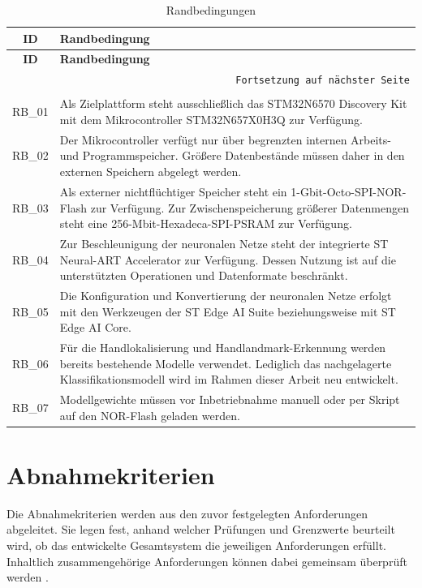 \begin{longtable}{|c|p{}|}
    \hline
    \textbf{ID} & \textbf{Randbedingung} \\
    \hline
    \endfirsthead
    \hline
    \textbf{ID} & \textbf{Randbedingung} \\
    \hline
    \endhead
    \hline
    \multicolumn{2}{r}{\texttt{Fortsetzung auf nächster Seite}} \\
    \endfoot
    \caption{Randbedingungen}
    \label{tab:randbedingungen} \\
    \endlastfoot
    RB\_01 & Als Zielplattform steht ausschließlich das STM32N6570 Discovery Kit mit dem Mikrocontroller STM32N657X0H3Q zur Verfügung. \\
    \hline
    RB\_02 & Der Mikrocontroller verfügt nur über begrenzten internen Arbeits- und Programmspeicher. Größere Datenbestände müssen daher in den externen Speichern abgelegt werden. \\
    \hline
    RB\_03 & Als externer nichtflüchtiger Speicher steht ein 1-Gbit-Octo-SPI-NOR-Flash zur Verfügung. Zur Zwischenspeicherung größerer Datenmengen steht eine 256-Mbit-Hexadeca-SPI-PSRAM zur Verfügung. \\
    \hline
    RB\_04 & Zur Beschleunigung der neuronalen Netze steht der integrierte ST Neural-ART Accelerator zur Verfügung. Dessen Nutzung ist auf die unterstützten Operationen und Datenformate beschränkt. \\
    \hline
    RB\_05 & Die Konfiguration und Konvertierung der neuronalen Netze erfolgt mit den Werkzeugen der ST Edge AI Suite beziehungsweise mit ST Edge AI Core. \\
    \hline
    RB\_06 & Für die Handlokalisierung und Handlandmark-Erkennung werden bereits bestehende Modelle verwendet. Lediglich das nachgelagerte Klassifikationsmodell wird im Rahmen dieser Arbeit neu entwickelt. \\
    \hline
    RB\_07 & Modellgewichte müssen vor Inbetriebnahme manuell oder per Skript auf den NOR-Flash geladen werden. \\
    \hline
\end{longtable}

\section{Abnahmekriterien}\label{sec:abnahmekriterien}

Die Abnahmekriterien werden aus den zuvor festgelegten Anforderungen abgeleitet. Sie legen fest, anhand welcher Prüfungen und Grenzwerte beurteilt wird, ob das entwickelte Gesamtsystem die jeweiligen Anforderungen erfüllt. Inhaltlich zusammengehörige Anforderungen können dabei gemeinsam überprüft werden \cite[S. 85 ff.]{kleukerAnforderungsanalyse2025}.

